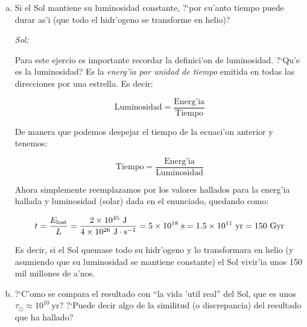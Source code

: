 \documentclass{article}
\begin{document}
\begin{enumerate} [a)]
\begin{equation}
E = mc^2
\end{equation}

De esta manera, la energ'ia perdida la podemos estimar a trav'es de la masa perdida:

\begin{equation}
E_{\rm lost} = M_{\rm lost} \times c^2 \approx 2 \times 10^{28} \ \text{kg} \times 10^{17} \ \text{m}^2\cdot \text{s}^{-2} = 2 \times 10^{45} \ \text{J}
\end{equation}

De manera que la energ'ia producida por el proceso de p'erdida de masa por fusi'on nuclear ser'ia de $\sim 2 \times 10^{45} \ \text{J}$.


\item Si el Sol mantiene su luminosidad constante, ?`por cu'anto tiempo puede durar as'i (que todo el hidr'ogeno se transforme en helio)?

\vspace{2mm}
\emph{Sol:}
\vspace{2mm}

Para este ejercio es importante recordar la definici'on de luminosidad. ?`Qu'e es la luminosidad? Es la \emph{energ'ia por unidad de tiempo} emitida en todas las direcciones por una estrella. Es decir:

\begin{equation}
\text{Luminosidad} = \frac{\text{Energ'ia}}{\text{Tiempo}}
\end{equation}

De manera que podemos despejar el tiempo de la ecuaci'on anterior y tenemos:

\begin{equation}
\text{Tiempo} = \frac{\text{Energ'ia}}{\text{Luminosidad}}
\end{equation}

Ahora simplemente reemplazamos por los valores hallados para la energ'ia hallada y luminosidad (solar) dada en el enunciado, quedando como:

\begin{equation}
t = \frac{E_{\rm lost}}{L} = \frac{2 \times 10^{45} \ \text{J}}{4 \times 10^{26} \ \text{J} \cdot \text{s}^{-1}} = 5 \times 10^{18} \ \text{s} = 1.5 \times 10^{11} \ \text{yr} = 150 \ \text{Gyr}
\end{equation}

Es decir, si el Sol quemase todo su hidr'ogeno y lo transformara en helio (y asumiendo que su luminosidad se mantiene constante) el Sol vivir'ia unos 150 mil millones de a'nos.


\item ?`C'omo se compara el resultado con ``la vida 'util real'' del Sol, que es unos $\tau_\odot \approx 10^{10} \ \text{yr}$? ?`Puede decir algo de la similitud (o discrepancia) del resultado que ha hallado?
\end{enumerate}
\end{document}
